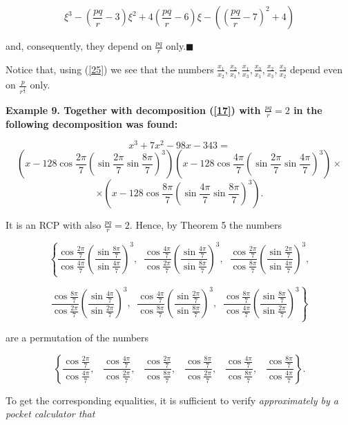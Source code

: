 \documentclass[12pt,oneside,english]{amsart}
\begin{document}
\begin{equation}\label{40}
\xi^3-\left(\frac{pq}{r}-3\right)\xi^2+4\left(\frac{pq}{r}-6\right)\xi
-\left(\left(\frac{pq}{r}-7\right)^2+4\right)
\end{equation}

and, consequently, they depend on $\frac{pq}{r}$ only.$\blacksquare$

Notice that, using (\ref{25}) we see that the numbers
$\frac{x_1}{x_2}, \frac{x_2}{x_1}, \frac{x_1}{x_3}, \frac{x_3}{x_1},
\frac{x_2}{x_3}, \frac{x_3}{x_2}$ depend even on $\frac{p}{r^{\frac
1 3}}$ only.


\bfseries Example 9. \mdseries  Together with decomposition
(\ref{17}) with $\frac{pq}{r}=2$ in \cite{7} the following
decomposition was found:

$$
x^3+7x^2-98x-343=
$$
$$
\left(x-128\cos\frac{2\pi}{7}
\left(\sin\frac{2\pi}{7}\sin\frac{8\pi}{7}\right)^3\right)
\left(x-128\cos\frac{4\pi}{7}
\left(\sin\frac{2\pi}{7}\sin\frac{4\pi}{7}\right)^3\right)\times
$$
$$
\times \left(x-128\cos\frac{8\pi}{7}
\left(\sin\frac{4\pi}{7}\sin\frac{8\pi}{7}\right)^3\right).
$$

It is an RCP with also $\frac{pq}{r}=2$. Hence, by Theorem 5 the
numbers

$$
\left\{\frac{\cos\frac{2\pi}{7}}{\cos\frac{4\pi}{7}}\left(\frac{\sin\frac{8\pi}{7}}
{\sin\frac{4\pi}{7}}\right)^3,\;\;\frac{\cos\frac{4\pi}{7}}{\cos\frac{2\pi}{7}}
\left(\frac{\sin\frac{4\pi}{7}}{\sin\frac{8\pi}{7}}\right)^3,\;\;
\frac{\cos\frac{2\pi}{7}}{\cos\frac{8\pi}{7}}\left(\frac{\sin\frac{2\pi}{7}}
{\sin\frac{4\pi}{7}}\right)^3,\right.
$$


$$
\left.
\frac{\cos\frac{8\pi}{7}}{\cos\frac{2\pi}{7}}\left(\frac{\sin\frac{4\pi}{7}}
{\sin\frac{2\pi}{7}}\right)^3,\;\;\frac{\cos\frac{4\pi}{7}}{\cos\frac{8\pi}{7}}
\left(\frac{\sin\frac{2\pi}{7}}{\sin\frac{8\pi}{7}}\right)^3,\;\;
\frac{\cos\frac{8\pi}{7}}{\cos\frac{4\pi}{7}}\left(\frac{\sin\frac{8\pi}{7}}
{\sin\frac{2\pi}{7}}\right)^3\right\}
$$

are a permutation of the numbers

$$
\left\{\frac{\cos\frac{2\pi}{7}}{\cos\frac{4\pi}{7}},\;\;\;
\frac{\cos\frac{4\pi}{7}}{\cos\frac{2\pi}{7}},\;\;\;
\frac{\cos\frac{2\pi}{7}}{\cos\frac{8\pi}{7}},\;\;\;
\frac{\cos\frac{8\pi}{7}}{\cos\frac{2\pi}{7}},\;\;\;
\frac{\cos\frac{4\pi}{7}}{\cos\frac{8\pi}{7}},\;\;\;
\frac{\cos\frac{8\pi}{7}}{\cos\frac{4\pi}{7}}\right\}.
$$

\newpage


To get the corresponding equalities, it is sufficient to verify
\slshape approximately \upshape by a pocket calculator that
\end{document}
